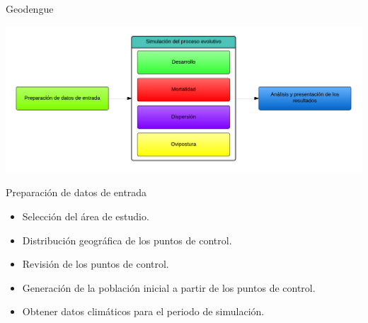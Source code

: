 
\begin{frame}[c]{Geodengue}
  \begin{center}
      \includegraphics[width=\textwidth]{./graphics/propuesta.png}
  \end{center}
\end{frame}


\begin{frame}[c]{Preparación de datos de entrada}
  \begin{center}
    \begin{itemize}
      \item Selección del área de estudio.
      \item Distribución geográfica de los puntos de control.
      \item Revisión de los puntos de control.
      \item Generación de la población inicial a partir de los puntos de control.
      \item Obtener datos climáticos para el periodo de simulación.
    \end{itemize}
  \end{center}
\end{frame}

